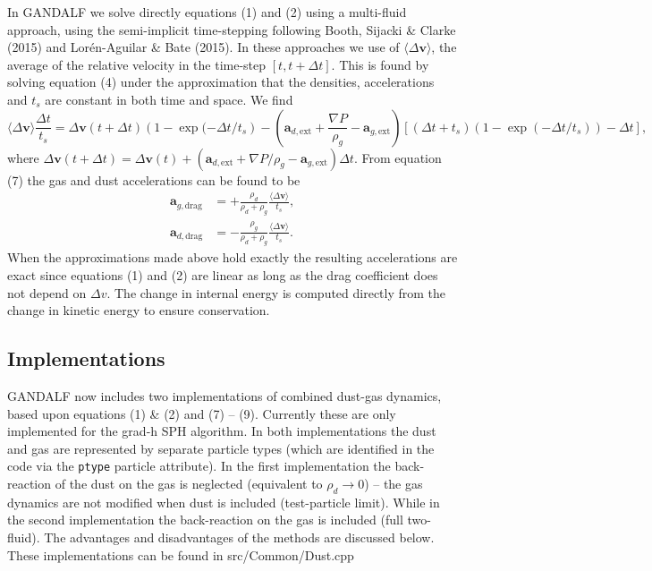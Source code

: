 \documentclass[a4paper]{article}
\renewcommand{\vec}[1]{\ensuremath{\mathbf{#1}}}
\begin{document}
In GANDALF we solve directly equations (1) and (2) using a multi-fluid approach, using the semi-implicit time-stepping following Booth, Sijacki \& Clarke (2015) and Lor\'en-Aguilar \& Bate (2015). In these approaches we use of $\langle \Delta \vec{v} \rangle$, the average of the relative velocity in the time-step $\left[ t,t + \Delta t\right]$. This is found by solving equation (4) under the approximation that the densities, accelerations and $t_s$ are constant in both time and space. We find
\begin{equation}
\langle \Delta \vec{v} \rangle \frac{\Delta t}{t_s} = \Delta \vec{v}(t+\Delta t) \left(1 - \exp(-\Delta t/ t_s\right) -
\left(\vec{a}_{d, \mathrm{ext}} + \frac{\nabla P}{\rho_g}  - \vec{a}_{g, \mathrm{ext}}\right)\left[(\Delta t + t_s)\left(1 - \exp(-\Delta t/ t_s)\right) - \Delta t \right],
\end{equation}
where $ \Delta \vec{v}(t+\Delta t) = \Delta \vec{v} (t) + \left(\vec{a}_{d, \mathrm{ext}} + \nabla P/\rho_g  - \vec{a}_{g, \mathrm{ext}}\right) \Delta t$. From equation (7) the gas and dust accelerations can be found to be
\begin{align}
\vec{a}_{g,\mathrm{drag}} &= + \frac{\rho_d}{\rho_d + \rho_g} \frac{\langle \Delta \vec{v} \rangle}{t_s}, \\
\vec{a}_{d,\mathrm{drag}} &= - \frac{\rho_g}{\rho_d + \rho_g} \frac{\langle \Delta \vec{v} \rangle}{t_s}.
\end{align}
When the approximations made above hold exactly the resulting accelerations are exact since equations (1) and (2) are linear as long as the drag coefficient does not depend on $\Delta v$. The change in internal energy is computed directly from the change in kinetic energy to ensure conservation.

\subsection{Implementations}

GANDALF now includes two implementations of combined dust-gas dynamics, based upon equations (1) \& (2) and  (7) -- (9). Currently these are only implemented for the grad-h SPH algorithm. In both implementations the dust and gas are represented by separate particle types (which are identified in the code via the \lstinline{ptype} particle attribute). In the first implementation the back-reaction of the dust on the gas is neglected (equivalent to  $\rho_d \rightarrow 0$) -- the gas dynamics are not modified when dust is included (test-particle limit). While in the second implementation the back-reaction on the gas is included (full two-fluid). The advantages and disadvantages of the methods are discussed below. These implementations can be found in src/Common/Dust.cpp
\end{document}
